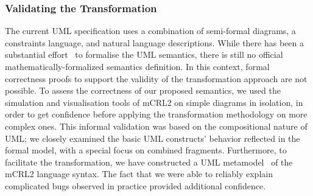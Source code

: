 \documentclass[letter]{llncs}
\newcommand{\secshrink}{\vspace{-.5cm}}
\begin{document}
\subsubsection{Validating the Transformation}
The current UML specification uses a combination of semi-formal diagrams, a constraints language, and natural language descriptions.
While there has been a substantial effort~\cite{Broy:2006:USS:1762828.1762881,lazuar2010tool,fUML,Diskin06mappings} to formalise the UML semantics, 
there is still no official mathematically-formalized semantics definition. 
In this context, formal correctness proofs to support the validity of the transformation approach are not possible.
To assess the correctness of our proposed semantics, we used the simulation and visualisation tools of mCRL2 on
simple diagrams in isolation, in order to get confidence before applying the transformation methodology on
more complex ones. This informal validation was based on the compositional nature of UML; we closely 
examined the basic UML constructs' behavior reflected in the formal model, with a special focus on combined fragments.
Furthermore, to facilitate the transformation, we have constructed a UML metamodel~\cite{repo:remenska} of the mCRL2 language syntax.
The fact that we were able to reliably explain complicated bugs observed in practice provided additional confidence.
%
% 
\secshrink
\end{document}
